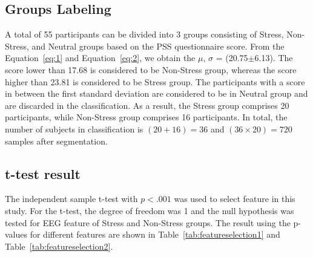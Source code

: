\documentclass[pdflatex,sn-mathphys]{sn-jnl}%
\theoremstyle{thmstyleone}%
\theoremstyle{thmstyletwo}%
\theoremstyle{thmstylethree}%
\begin{document}
\subsection{Groups Labeling} \label{subsec6}
A total of 55 participants can be divided into 3 groups consisting of Stress, Non-Stress, and Neutral groups based on the PSS questionnaire score. From the Equation~\ref{eq:1} and Equation~\ref{eq:2}, we obtain the $\mu$, $\sigma$ = (20.75$\pm$6.13). The score lower than 17.68 is considered to be Non-Stress group, whereas the score higher than 23.81 is considered to be Stress group. The participants with a score in between the first standard deviation are considered to be in Neutral group and are discarded in the classification. As a result, the Stress group comprises 20 participants, while Non-Stress group comprises 16 participants. In total, the number of subjects in classification is $(20 + 16) = 36$ and $(36 \times 20) = 720$ samples after segmentation.

\subsection{t-test result}
The independent sample t-test with $p < .001$ was used to select feature in this study. For the t-test, the degree of freedom was 1 and the null hypothesis was tested for EEG feature of Stress and Non-Stress groups. The result using the p-values for different features are shown in Table~\ref{tab:featureselection1} and Table~\ref{tab:featureselection2}. 

\end{document}
